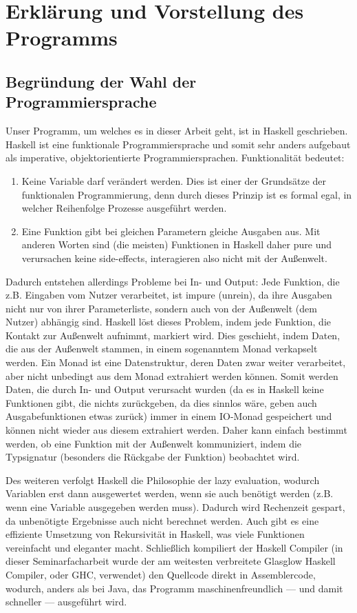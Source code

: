 \documentclass[twoside,a4paper,draft]{article}
\begin{document}
\section{Erklärung und Vorstellung des Programms}

\subsection{Begründung der Wahl der Programmiersprache}

Unser Programm, um welches es in dieser Arbeit geht, ist in Haskell geschrieben. Haskell ist eine funktionale Programmiersprache und somit sehr anders aufgebaut als imperative, objektorientierte Programmiersprachen. Funktionalität bedeutet:

\begin{enumerate}
\item Keine Variable darf verändert werden. Dies ist einer der Grundsätze der funktionalen Programmierung, denn durch dieses Prinzip ist es formal egal, in welcher Reihenfolge Prozesse ausgeführt werden.
\item Eine Funktion gibt bei gleichen Parametern gleiche Ausgaben aus. Mit anderen Worten sind (die meisten) Funktionen in Haskell daher \glqq{}pure\grqq{} und verursachen keine \glqq{}side-effects\grqq{}, interagieren also nicht mit der Außenwelt.
\end{enumerate}

Dadurch entstehen allerdings Probleme bei In- und Output: Jede Funktion, die z.B. Eingaben vom Nutzer verarbeitet, ist \glqq{}impure\grqq{} (unrein), da ihre Ausgaben nicht nur von ihrer Parameterliste, sondern auch von der Außenwelt (dem Nutzer) abhängig sind. Haskell löst dieses Problem, indem jede Funktion, die Kontakt zur Außenwelt aufnimmt, markiert wird. Dies geschieht, indem Daten, die aus der Außenwelt stammen, in einem sogenanntem \glqq{}Monad\grqq{} verkapselt werden. Ein Monad ist eine Datenstruktur, deren Daten zwar weiter verarbeitet, aber nicht unbedingt aus dem Monad extrahiert werden können. Somit werden Daten, die durch In- und Output verursacht wurden (da es in Haskell keine Funktionen gibt, die nichts zurückgeben, da dies sinnlos wäre, geben auch Ausgabefunktionen etwas zurück) immer in einem \glqq{}IO-Monad\grqq{} gespeichert und können nicht wieder aus diesem extrahiert werden. Daher kann einfach bestimmt werden, ob eine Funktion mit der Außenwelt kommuniziert, indem die Typsignatur (besonders die Rückgabe der Funktion) beobachtet wird.

Des weiteren verfolgt Haskell die Philosophie der \glqq{}lazy evaluation\grqq{}, wodurch Variablen erst dann ausgewertet werden, wenn sie auch benötigt werden (z.B. wenn eine Variable ausgegeben werden muss). Dadurch wird Rechenzeit gespart, da unbenötigte Ergebnisse auch nicht berechnet werden. Auch gibt es eine effiziente Umsetzung von Rekursivität in Haskell, was viele Funktionen vereinfacht und eleganter macht. Schließlich kompiliert der Haskell Compiler (in dieser Seminarfacharbeit wurde der am weitesten verbreitete Glasglow Haskell Compiler, oder GHC, verwendet) den Quellcode direkt in Assemblercode, wodurch, anders als bei Java, das Programm maschinenfreundlich --- und damit schneller --- ausgeführt wird.
\end{document}
